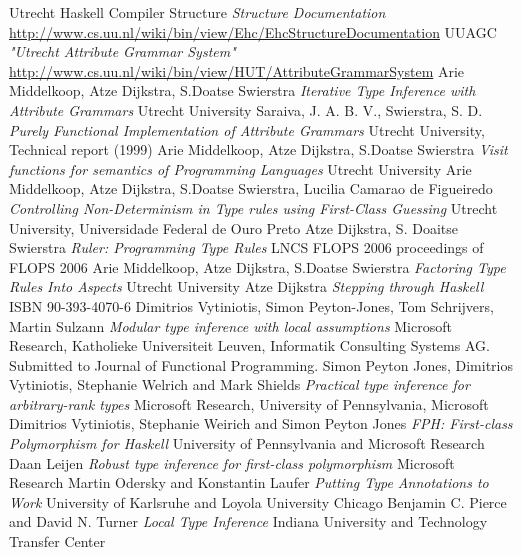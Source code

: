 \begin{thebibliography}{9}
  Utrecht Haskell Compiler Structure
  \emph{Structure Documentation}
   \url{http://www.cs.uu.nl/wiki/bin/view/Ehc/EhcStructureDocumentation}
  UUAGC
  \emph{"Utrecht Attribute Grammar System"}
   \url{http://www.cs.uu.nl/wiki/bin/view/HUT/AttributeGrammarSystem}
  Arie Middelkoop, Atze Dijkstra, S.Doatse Swierstra
  \emph{Iterative Type Inference with Attribute Grammars}
  Utrecht University
  Saraiva, J. A. B. V., Swierstra, S. D.
  \emph{Purely Functional Implementation of Attribute Grammars}
  Utrecht University, Technical report (1999)
  Arie Middelkoop, Atze Dijkstra, S.Doatse Swierstra
  \emph{Visit functions for semantics of Programming Languages}
  Utrecht University
  Arie Middelkoop, Atze Dijkstra, S.Doatse Swierstra, Lucilia Camarao de Figueiredo
  \emph{Controlling Non-Determinism in Type rules using First-Class Guessing}
  Utrecht University, Universidade Federal de Ouro Preto
  Atze Dijkstra, S. Doaitse Swierstra 
  \emph{Ruler: Programming Type Rules}
  LNCS FLOPS 2006 proceedings of FLOPS 2006
  Arie Middelkoop, Atze Dijkstra, S.Doatse Swierstra
  \emph{Factoring Type Rules Into Aspects}
  Utrecht University
  Atze Dijkstra
  \emph{Stepping through Haskell}
  ISBN 90-393-4070-6
  Dimitrios Vytiniotis, Simon Peyton-Jones, Tom Schrijvers, Martin Sulzann
  \emph{Modular type inference with local assumptions}
  Microsoft Research, Katholieke Universiteit Leuven, Informatik Consulting Systems AG.
  Submitted to Journal of Functional Programming.
  Simon Peyton Jones, Dimitrios Vytiniotis, Stephanie Welrich and Mark Shields
  \emph{Practical type inference for arbitrary-rank types}
  Microsoft Research, University of Pennsylvania, Microsoft
  Dimitrios Vytiniotis, Stephanie Weirich and Simon Peyton Jones
  \emph{FPH: First-class Polymorphism for Haskell}
  University of Pennsylvania and Microsoft Research
  Daan Leijen
  \emph{Robust type inference for first-class polymorphism}
  Microsoft Research
  Martin Odersky and Konstantin Laufer
  \emph{Putting Type Annotations to Work}
  University of Karlsruhe and Loyola University Chicago
  Benjamin C. Pierce and David N. Turner
  \emph{Local Type Inference}
  Indiana University and Technology Transfer Center
\end{thebibliography}
